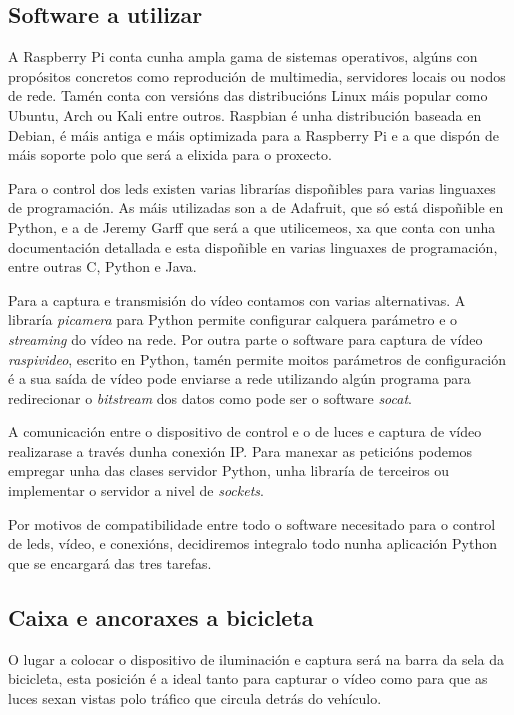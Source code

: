 \subsection{Software a utilizar}
A Raspberry Pi conta cunha ampla gama de sistemas operativos, algúns con propósitos concretos como reprodución de multimedia, servidores locais ou nodos de rede. Tamén conta con versións das distribucións Linux máis popular como Ubuntu, Arch ou Kali entre outros.
Raspbian é unha distribución baseada en Debian, é máis antiga e máis optimizada para a Raspberry Pi e a que dispón de máis soporte polo que será a elixida para o proxecto.

Para o control dos leds existen varias librarías dispoñibles para varias linguaxes de programación. As máis utilizadas son a de Adafruit, que só está dispoñible en Python, e a de Jeremy Garff que será a que utilicemeos, xa que conta con unha documentación detallada e esta dispoñible en varias linguaxes de programación, entre outras C, Python e Java.

Para a captura e transmisión do vídeo contamos con varias alternativas. A libraría \emph{picamera} para Python permite configurar calquera parámetro e o \emph{streaming} do vídeo na rede. Por outra parte o software para captura de vídeo \emph{raspivideo}, escrito en Python, tamén permite moitos parámetros de configuración é a sua saída de vídeo pode enviarse a rede utilizando algún programa para redirecionar o \emph{bitstream} dos datos como pode ser o software \emph{socat}.

A comunicación entre o dispositivo de control e o de luces e captura de vídeo realizarase a través dunha conexión IP. Para manexar as peticións podemos empregar unha das clases servidor Python, unha libraría de terceiros ou implementar o servidor a nivel de \emph{sockets}.

Por motivos de compatibilidade entre todo o software necesitado para o control de leds, vídeo, e conexións, decidiremos integralo todo nunha aplicación Python que se encargará das tres tarefas.

\subsection{Caixa e ancoraxes a bicicleta}


O lugar a colocar o dispositivo de iluminación e captura será na barra da sela da bicicleta, esta posición é a ideal tanto para capturar o vídeo como para que as luces sexan vistas polo tráfico que circula detrás do vehículo.

